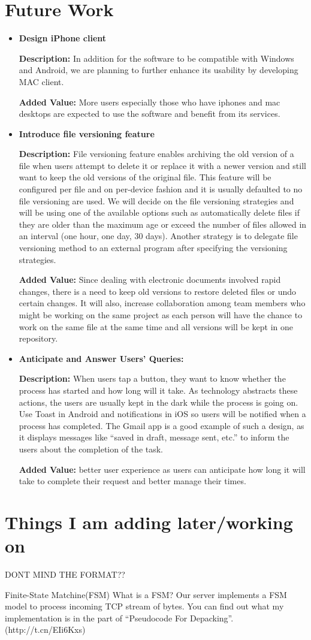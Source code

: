 \documentclass{article}
\begin{document}
\section{Future Work}
\begin{itemize}

\item \textbf{Design iPhone client}

\textbf{Description:} In addition for the software to be compatible with Windows and Android, we are planning to further enhance its usability by developing MAC client.

\textbf{Added Value:} More users especially those who have iphones and mac desktops are expected to use the software and benefit from its services.
\item \textbf{Introduce file versioning feature}

\textbf{Description:} File versioning feature enables archiving the old version of a file when users attempt to delete it or replace it with a newer version and still want to keep the old versions of the original file. This feature will be configured per file and on per-device fashion and it is usually defaulted to no file versioning are used.
We will decide on the file versioning strategies and will be using one of the available options such as automatically delete files if they are older than the maximum age or exceed the number of files allowed in an interval (one hour, one day, 30 days). Another strategy is to delegate file versioning method to an external program after specifying the versioning strategies.

\textbf{Added Value:} Since dealing with electronic documents involved rapid changes, there is a need to keep old versions to restore deleted files or undo certain changes. It will also, increase collaboration among team members who might be working on the same project as each person will have the chance to work on the same file at the same time and all versions will be kept in one repository.


\item \textbf{Anticipate and Answer Users’ Queries:}

\textbf{Description:} When users tap a button, they want to know whether the process has started and how long will it take. As technology abstracts these actions, the users are usually kept in the dark while the process is going on. Use Toast in Android and notifications in iOS so users will be notified when a process has completed. The Gmail app is a good example of such a design, as it displays messages like “saved in draft, message sent, etc.” to inform the users about the completion of the task.

\textbf{Added Value:} better user experience as users can anticipate how long it will take to complete their request and better manage their times.
\end{itemize}

\section{Things I am adding later/working on}
DONT MIND THE FORMAT??

Finite-State Matchine(FSM)
What is a FSM?
Our server implements a FSM model to process incoming TCP stream of bytes.
You can find out what my implementation is in the part of “Pseudocode For Depacking”. (http://t.cn/EIi6Kxs)
\end{document}

